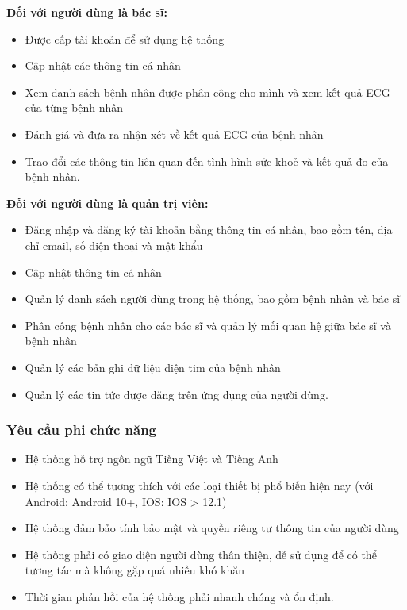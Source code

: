 \textbf{Đối với người dùng là bác sĩ:}

\begin{itemize}
    \item Được cấp tài khoản để sử dụng hệ thống
    \item Cập nhật các thông tin cá nhân
    \item Xem danh sách bệnh nhân được phân công cho mình và xem kết quả ECG của từng bệnh nhân
    \item Đánh giá và đưa ra nhận xét về kết quả ECG của bệnh nhân
    \item Trao đổi các thông tin liên quan đến tình hình sức khoẻ và kết quả đo của bệnh nhân.
\end{itemize}

\textbf{Đối với người dùng là quản trị viên:}
\begin{itemize}
    \item Đăng nhập và đăng ký tài khoản bằng thông tin cá nhân, bao gồm tên, địa chỉ email, số điện thoại và mật khẩu
    \item Cập nhật thông tin cá nhân
    \item Quản lý danh sách người dùng trong hệ thống, bao gồm bệnh nhân và bác sĩ
    \item Phân công bệnh nhân cho các bác sĩ và quản lý mối quan hệ giữa bác sĩ và bệnh nhân
    \item Quản lý các bản ghi dữ liệu điện tim của bệnh nhân
    \item Quản lý các tin tức được đăng trên ứng dụng của người dùng.
\end{itemize}

\subsubsection{Yêu cầu phi chức năng}
\begin{itemize}
    \item Hệ thống hỗ trợ ngôn ngữ Tiếng Việt và Tiếng Anh
    \item Hệ thống có thể tương thích với các loại thiết bị phổ biến hiện nay (với Android: Android 10+, IOS: IOS > 12.1)
    \item Hệ thống đảm bảo tính bảo mật và quyền riêng tư thông tin của người dùng
    \item Hệ thống phải có giao diện người dùng thân thiện, dễ sử dụng để có thể tương tác mà không gặp quá nhiều khó khăn
    \item Thời gian phản hồi của hệ thống phải nhanh chóng và ổn định.
\end{itemize}

